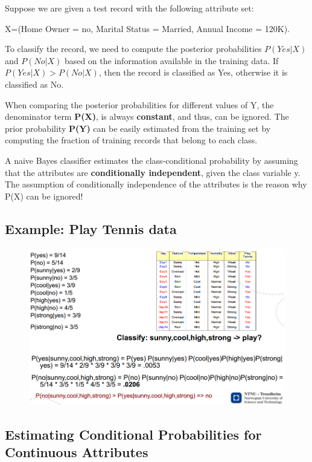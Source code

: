 		Suppose we are given a test record with the following attribute set:

		X=(Home Owner = no, Marital Status = Married, Annual Income = 120K).

		To classify the record, we need to compute the posterior probabilities
		$P(Yes|X)$ and $P(No|X)$ based on the information available in the training data.
		If $P(Yes|X) > P(No|X)$, then the record is classified as Yes, otherwise it is classified
		as No. 

		When comparing the posterior probabilities for different values of Y, the denominator term
		{\bf P(X)}, is always {\bf constant}, and thus, can be ignored. 
		The prior probability {\bf P(Y)} can be easily estimated from the training set by computing
		the fraction of training records that belong to each class.	

		A naive Bayes classifier estimates the class-conditional probability by assuming 
		that the attributes are {\bf conditionally independent}, given the class variable y. 
		The assumption of conditionally independence of the attributes is the reason why P(X)
		can be ignored!

		\subsection*{Example: Play Tennis data}

		\begin{figure}[H]
			\includegraphics[width=\textwidth]{pics/examplenaive.png}
		\end{figure}

		\subsection{Estimating Conditional Probabilities for Continuous Attributes}

